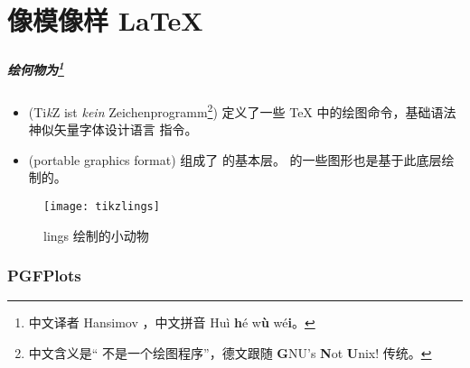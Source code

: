 
\part{像模像样 \LaTeX{}}

\section{\TikZ{}}

\begin{frame}
  \frametitle{绘何物为\footnote{中文译者 Hansimov ，中文拼音 Hu\`i \textbf{h}\'e w\textbf{\`u} w\'e\textbf{i}。}}

  \begin{itemize}
    \item \TikZ{} (\alert{T}i\textit{k}Z \alert{i}st \textit{\alert{k}ein} \alert{Z}eichenprogramm\footnote{中文含义是“\TikZ{} 不是一个绘图程序”，德文跟随 \textbf{G}NU's \textbf{N}ot \textbf{U}nix! 传统。}) 定义了一些 \TeX{} 中的绘图命令，基础语法神似矢量字体设计语言  指令。
    \item \pgf{} (\alert{p}ortable \alert{g}raphics \alert{f}ormat) 组成了 \TikZ{} 的基本层。 的一些图形也是基于此底层绘制的。
  \end{itemize}

  \begin{figure}
    \texttt{[image: tikzlings]}
    \caption{\TikZ{}lings 绘制的小动物 }
  \end{figure}

\end{frame}

\section{PGFPlots}

